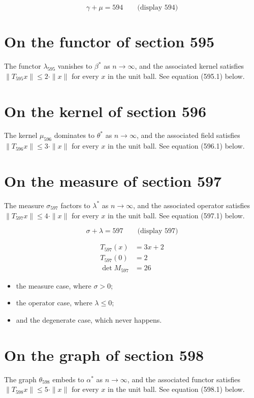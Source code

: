 \documentclass{article}
\begin{document}
$$
\gamma + \mu = 594 \qquad \text{(display 594)}
$$

\section{On the functor of section 595}
The functor $\lambda_{595}$ vanishes to $\beta^{*}$ as $n \to \infty$,
and the associated kernel satisfies $\|T_{595} x\| \leq 2 \cdot \|x\|$
for every $x$ in the unit ball. See equation (595.1) below.

\section{On the kernel of section 596}
The kernel $\mu_{596}$ dominates to $\theta^{*}$ as $n \to \infty$,
and the associated field satisfies $\|T_{596} x\| \leq 3 \cdot \|x\|$
for every $x$ in the unit ball. See equation (596.1) below.

\section{On the measure of section 597}
The measure $\sigma_{597}$ factors to $\lambda^{*}$ as $n \to \infty$,
and the associated operator satisfies $\|T_{597} x\| \leq 4 \cdot \|x\|$
for every $x$ in the unit ball. See equation (597.1) below.

$$
\sigma + \lambda = 597 \qquad \text{(display 597)}
$$

\begin{align}
T_{597}(x) &= 3 x + 2 \\
T_{597}(0) &= 2 \\
\det M_{597} &= 26
\end{align}

\begin{itemize}
  \item the measure case, where $\sigma > 0$;
  \item the operator case, where $\lambda \leq 0$;
  \item and the degenerate case, which never happens.
\end{itemize}

\section{On the graph of section 598}
The graph $\theta_{598}$ embeds to $\alpha^{*}$ as $n \to \infty$,
and the associated functor satisfies $\|T_{598} x\| \leq 5 \cdot \|x\|$
for every $x$ in the unit ball. See equation (598.1) below.
\end{document}
